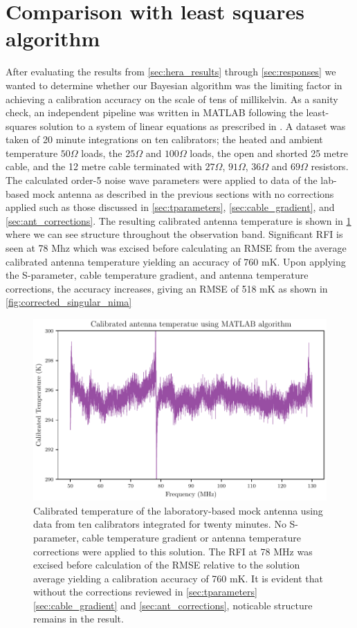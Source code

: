 \section{Comparison with least squares algorithm}\label{sec:matlab_results}
After evaluating the results from \cref{sec:hera_results} through \cref{sec:responses} we wanted to determine whether our Bayesian algorithm was the limiting factor in achieving a calibration accuracy on the scale of tens of millikelvin. As a sanity check, an independent pipeline was written in MATLAB following the least-squares solution to a system of linear equations as prescribed in \citet{edgesCal}. A dataset was taken of 20 minute integrations on ten calibrators; the heated and ambient temperature $50 \Omega$ loads, the $25 \Omega$ and $100 \Omega$ loads, the open and shorted 25 metre cable, and the 12 metre cable terminated with $27 \Omega$, $91 \Omega$, $36 \Omega$ and $69 \Omega$ resistors. The calculated order-5 noise wave parameters were applied to data of the lab-based mock antenna as described in the previous sections with no corrections applied such as those discussed in \cref{sec:tparameters}, \cref{sec:cable_gradient}, and \cref{sec:ant_corrections}. The resulting calibrated antenna temperature is shown in \cref{fig:raw_singular_nima} where we can see structure throughout the observation band. Significant RFI is seen at 78 Mhz which was excised before calculating an RMSE from the average calibrated antenna temperature yielding an accuracy of 760 mK. Upon applying the S-parameter, cable temperature gradient, and antenna temperature corrections, the accuracy increases, giving an RMSE of 518 mK as shown in \cref{fig:corrected_singular_nima}
\begin{figure}
    \centering
    \includegraphics[width=.8\textwidth]{raw_matlab_solution}
    \caption{Calibrated temperature of the laboratory-based mock antenna using data from ten calibrators integrated for twenty minutes. No S-parameter, cable temperature gradient or antenna temperature corrections were applied to this solution. The RFI at 78 MHz was excised before calculation of the RMSE relative to the solution average yielding a calibration accuracy of 760 mK. It is evident that without the corrections reviewed in \cref{sec:tparameters} \cref{sec:cable_gradient} and \cref{sec:ant_corrections}, noticable structure remains in the result.}
    \label{fig:raw_singular_nima}
\end{figure}
